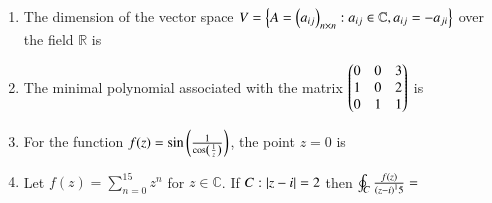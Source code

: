 \documentclass[journal]{IEEEtran}
\begin{document}
\begin{enumerate}
\item The dimension of the vector space $V=\left\{A=\left(a_{ij}\right)_{n \times n}: a_{ij} \in \mathbb C,a_{ij}=-a_{ji}\right\}$ over the field $\mathbb R$ is
\begin{enumerate}
\end{enumerate}

\item The minimal polynomial associated with the matrix $\begin{pmatrix}0&0&3\\1&0&2\\0&1&1\end{pmatrix}$ is 
\begin{enumerate}
\end{enumerate}

\item For the function $f(z)=\sin \left(\frac{1}{\cos \left(\frac{1}{z}\right)}\right)$, the point $z=0$ is
\begin{enumerate}
\end{enumerate}

\item Let $f(z)=\sum _{n=0}^{15} z^{n}$ for $z \in \mathbb C$. If $C:\left\vert z-i\right\vert=2$ then $\oint_C
\frac{f(z)}{\left(z-i\right)^15}=$
\begin{enumerate}
\end{enumerate}


\end{enumerate}
\end{document}
